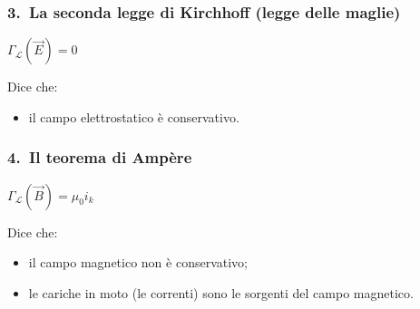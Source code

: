 \documentclass[]{beamer}
\theoremstyle{plain}
\begin{document}
\begin{frame}
  \frametitle{3.~La seconda legge di Kirchhoff (legge delle maglie)}
  \begin{center}
\colorbox{blue!30}{  $ \Gamma_\mathscr{L} (\vec{E}) = 0 $}
  \end{center}\pause
  Dice che:
  \begin{itemize}
    \item il campo elettrostatico è conservativo.
  \end{itemize}
\end{frame}

\begin{frame}
  \frametitle{4.~Il teorema di Ampère}
  \begin{center}
\colorbox{blue!30}{$ \Gamma_\mathscr{L} (\vec{B}) = \mu_0 i_k $}
  \end{center}\pause
  Dice che:
  \begin{itemize}
    \item il campo magnetico non è conservativo;\pause
    \item le cariche in moto (le correnti) sono le sorgenti del campo magnetico.
  \end{itemize}
\end{frame}
\end{document}
